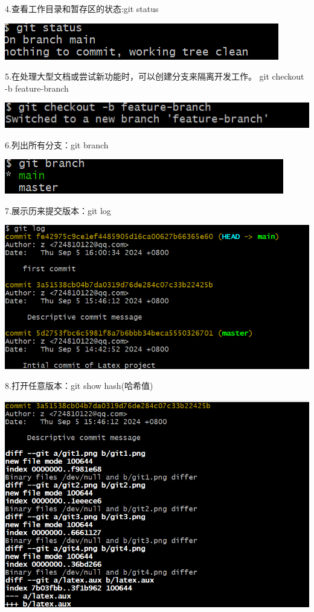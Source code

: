 \documentclass{article}
\begin{document}
	4.查看工作目录和暂存区的状态:git status
	
	\noindent
	\begin{minipage}{\linewidth}
	\centering
	\includegraphics[width=0.5\linewidth]{example6.png}
	\label{fig:example}
	\end{minipage}
	
	5.在处理大型文档或尝试新功能时，可以创建分支来隔离开发工作。
	git checkout -b feature-branch
	
	\noindent
	\begin{minipage}{\linewidth}
		\centering
		\includegraphics[width=0.5\linewidth]{example5.png}
		\label{fig:example}
	\end{minipage}
	
	6.列出所有分支：git branch
	
	\noindent
	\begin{minipage}{\linewidth}
		\centering
		\includegraphics[width=0.5\linewidth]{example7.png}
		\label{fig:example}
	\end{minipage}
	
	7.展示历来提交版本：git log
	
	\noindent
	\begin{minipage}{\linewidth}
		\centering
		\includegraphics[width=0.5\linewidth]{example8.png}
		\label{fig:example}
	\end{minipage}
	
	8.打开任意版本：git show hash(哈希值)
	
	\noindent
	\begin{minipage}{\linewidth}
		\centering
		\includegraphics[width=0.5\linewidth]{example9.png}
		\label{fig:example}
	\end{minipage}
	
\end{document}
